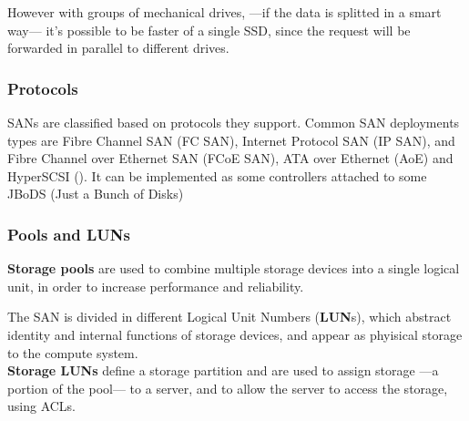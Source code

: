However with groups of mechanical drives, ---if the data is splitted in a smart way--- it's possible to be faster of a single SSD, since the request will be forwarded in parallel to different drives.

\subsubsection{Protocols}
SANs are classified based on protocols they support.
Common SAN deployments types are Fibre Channel SAN (FC SAN), Internet Protocol SAN (IP SAN), and Fibre Channel over Ethernet SAN (FCoE SAN), ATA over Ethernet (AoE) and HyperSCSI ().
It can be implemented as some controllers attached to some JBoDS (Just a Bunch of Disks)



\subsubsection{Pools and LUNs}

\textbf{Storage pools} are used to combine multiple storage devices into a single logical unit, in order to increase performance and reliability. 

The SAN is divided in different Logical Unit Numbers (\textbf{LUN}s), which abstract identity and internal functions of storage devices, and appear as phyisical storage to the compute system.\\
\textbf{Storage LUNs} define a storage partition and are used to assign storage ---a portion of the pool--- to a server, and to allow the server to access the storage, using ACLs.
\nl

